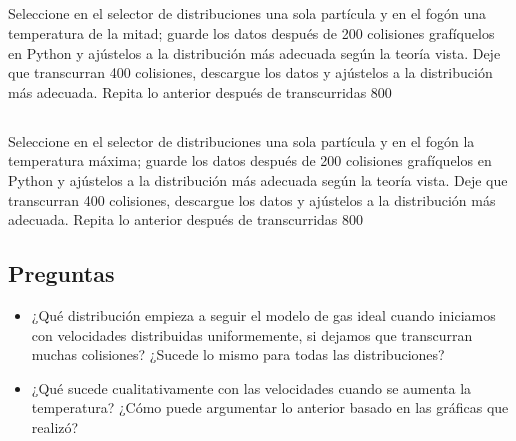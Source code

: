 \documentclass[11pt]{article}
\begin{document}
\subsection{}
Seleccione en el selector de distribuciones una sola partícula y en el fogón una temperatura de la mitad; guarde los datos después de 200 colisiones grafíquelos en Python y ajústelos a la distribución más adecuada según la teoría vista. Deje que transcurran 400 colisiones, descargue los datos y ajústelos a la distribución más adecuada. Repita lo anterior después de transcurridas 800

\subsection{}
Seleccione en el selector de distribuciones una sola partícula y en el fogón la temperatura máxima; guarde los datos después de 200 colisiones grafíquelos en Python y ajústelos a la distribución más adecuada según la teoría vista. Deje que transcurran 400 colisiones, descargue los datos y ajústelos a la distribución más adecuada. Repita lo anterior después de transcurridas 800

\subsection{Preguntas}

\begin{itemize}
    \item ¿Qué distribución empieza a seguir el modelo de gas ideal cuando iniciamos con velocidades distribuidas uniformemente, si dejamos que transcurran muchas colisiones? ¿Sucede lo mismo para todas las distribuciones? 
    \item ¿Qué sucede cualitativamente con las velocidades cuando se aumenta la temperatura? ¿Cómo puede argumentar lo anterior basado en las gráficas que realizó?
    
\end{itemize}
\end{document}
